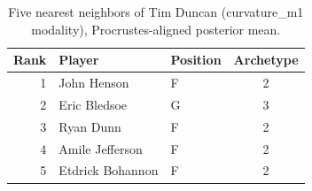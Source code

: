 \begin{table}[htbp]
  \centering\small
  \begin{tabular}{rllc}
    \toprule
    Rank & Player & Position & Archetype \\
    \midrule
    1 & John Henson & F & 2 \\
    2 & Eric Bledsoe & G & 3 \\
    3 & Ryan Dunn & F & 2 \\
    4 & Amile Jefferson & F & 2 \\
    5 & Etdrick Bohannon & F & 2 \\
    \bottomrule
  \end{tabular}
  \caption{Five nearest neighbors of Tim Duncan (curvature_m1 modality), Procrustes-aligned posterior mean.}
  \label{tab:Tim_Duncan_neighbors_curvature_m1}
\end{table}


